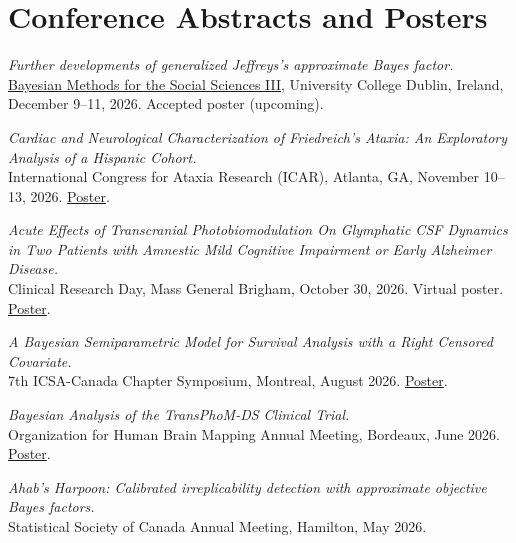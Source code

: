 \documentclass[9pt]{extarticle}
\begin{document}
\section{Conference Abstracts and Posters}
{\normalsize
\textit{Further developments of generalized Jeffreys's approximate Bayes factor.}\\
\href{https://bayesforshs3.sciencesconf.org/}{Bayesian Methods for the Social Sciences III}, University College Dublin, Ireland, December 9--11, 2026. Accepted poster (upcoming).\par\vspace{6pt}

\textit{Cardiac and Neurological Characterization of Friedreich's Ataxia: An Exploratory Analysis of a Hispanic Cohort.}\\
International Congress for Ataxia Research (ICAR), Atlanta, GA, November 10--13, 2026.
\href{https://punnettsquare9331.github.io/posters/cardiac-neurological-friedreich-ataxia-icar-2026.pdf}{Poster}.\par\vspace{6pt}

\textit{Acute Effects of Transcranial Photobiomodulation On Glymphatic CSF Dynamics in Two Patients with Amnestic Mild Cognitive Impairment or Early Alzheimer Disease.}\\
Clinical Research Day, Mass General Brigham, October 30, 2026. Virtual poster.
\href{https://punnettsquare9331.github.io/posters/clinical-research-day-2026.pdf}{Poster}.\par\vspace{6pt}

\textit{A Bayesian Semiparametric Model for Survival Analysis with a Right Censored Covariate.}\\
7th ICSA-Canada Chapter Symposium, Montreal, August 2026.
\href{https://punnettsquare9331.github.io/posters/spartaccus-icsa-2026.pdf}{Poster}.\par\vspace{6pt}

\textit{Bayesian Analysis of the TransPhoM-DS Clinical Trial.}\\
Organization for Human Brain Mapping Annual Meeting, Bordeaux, June 2026.
\href{https://punnettsquare9331.github.io/posters/transphom-ds-ohbm-2026.pdf}{Poster}.\par\vspace{6pt}

\textit{Ahab's Harpoon: Calibrated irreplicability detection with approximate objective Bayes factors.}\\
Statistical Society of Canada Annual Meeting, Hamilton, May 2026.\par\vspace{6pt}

}
\end{document}
